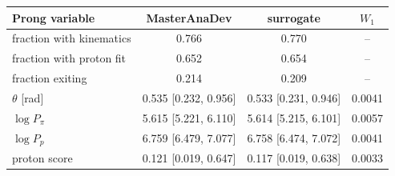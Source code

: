 \begin{tabular}{lccc}
\toprule
Prong variable & MasterAnaDev & surrogate & $W_1$ \\
\midrule
fraction with kinematics & 0.766 & 0.770 & -- \\
fraction with proton fit & 0.652 & 0.654 & -- \\
fraction exiting & 0.214 & 0.209 & -- \\
$\theta$ [rad] & 0.535 [0.232, 0.956] & 0.533 [0.231, 0.946] & 0.0041 \\
$\log P_\pi$ & 5.615 [5.221, 6.110] & 5.614 [5.215, 6.101] & 0.0057 \\
$\log P_p$ & 6.759 [6.479, 7.077] & 6.758 [6.474, 7.072] & 0.0041 \\
proton score & 0.121 [0.019, 0.647] & 0.117 [0.019, 0.638] & 0.0033 \\
\bottomrule
\end{tabular}
